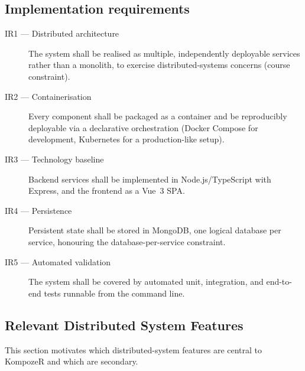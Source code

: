 \subsection{Implementation requirements}\label{implementation-requirements}


\begin{description}
  \item[IR1 --- Distributed architecture] The system shall be realised as
  multiple, independently deployable services rather than a monolith, to
  exercise distributed-systems concerns (course constraint).

  \item[IR2 --- Containerisation] Every component shall be packaged as a
  container and be reproducibly deployable via a declarative orchestration
  (Docker Compose for development, Kubernetes for a production-like setup).

  \item[IR3 --- Technology baseline] Backend services shall be implemented in
  Node.js/TypeScript with Express, and the frontend as a Vue~3 SPA.

  \item[IR4 --- Persistence] Persistent state shall be stored in MongoDB, one
  logical database per service, honouring the database-per-service constraint.

  \item[IR5 --- Automated validation] The system shall be covered by automated
  unit, integration, and end-to-end tests runnable from the command line.
\end{description}

\subsection{Relevant Distributed System Features}
\label{ds-features}

This section motivates which distributed-system features are central to
KompozeR and which are secondary.

